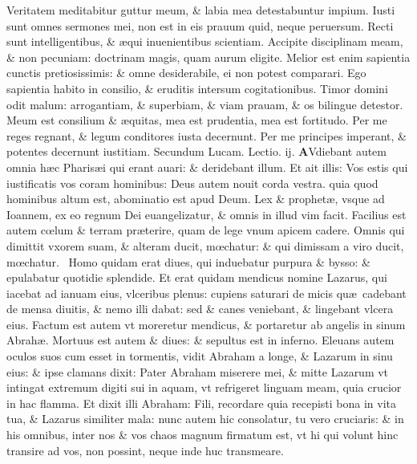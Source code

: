 \documentclass[a5paper,10pt]{book}
\def\leftmarginnote{%
	\lrmarginnote{\hskip -\marginparsep \hskip -6.5em}}
\def\ae{æ}
\def\oe{œ}
\begin{document}
\begin{multicols*}{2}
Veritatem meditabitur guttur meum, \& labia mea detestabuntur impium.
Iusti sunt omnes sermones mei, non est in eis prauum quid, neque peruersum. Recti sunt intelligentibus, \& \ae qui inuenientibus scientiam.
Accipite disciplinam meam, \& non pecuniam: doctrinam magis, quam aurum eligite.
Melior est enim sapientia cunctis pretiosissimis: \& omne desiderabile, ei non potest comparari.
Ego sapientia habito in consilio, \& eruditis intersum cogitationibus.
Timor domini odit malum: arrogantiam, \& superbiam, \& viam prauam, \& os bilingue detestor.
Meum est consilium \& \ae quitas, mea est prudentia, mea est fortitudo.
Per me reges regnant, \& legum conditores iusta decernunt. Per me principes imperant, \& potentes decernunt iustitiam.
\fancyhead[C]{\color{red} Feria. iiij. Dominic\ae . ij. post aduentum}
\newline \color{red} Secundum Lucam. \hfill Lectio. ij. \color{black}
\vspace{-.25em}
\lettrine[lines=2]{\bfseries \color{red} A}{}Vdiebant\leftmarginnote{\begin{flushright}c. 16.\end{flushright}} autem omnia h\ae c Pharis\ae i qui erant auari: \& deridebant illum.
Et ait illis: Vos estis qui iustificatis vos coram hominibus: Deus autem nouit corda vestra. quia quod hominibus altum est, abominatio est apud Deum.
Lex \& prophet\ae , vsque ad Ioannem, ex eo regnum Dei euangelizatur, \& omnis in illud vim facit.
Facilius est autem c\oe lum \& terram pr\ae terire, quam de lege vnum apicem cadere.
Omnis qui dimittit vxorem suam, \& alteram ducit, m\oe chatur: \& qui dimissam a viro ducit, m\oe chatur. \textdagger \ 
Homo\leftmarginnote{\begin{flushright}C\end{flushright}} quidam erat diues, qui induebatur purpura \& bysso: \& epulabatur quotidie splendide.
Et erat quidam mendicus nomine Lazarus, qui iacebat ad ianuam eius, vlceribus plenus: cupiens saturari de micis qu\ae \ cadebant de mensa
diuitis, \& nemo illi dabat: sed \& canes veniebant, \& lingebant vlcera eius.
Factum est autem vt moreretur mendicus, \& portaretur ab angelis in sinum Abrah\ae .
Mortuus est autem \& diues: \& sepultus est in inferno. Eleuans autem oculos suos cum esset in tormentis, vidit Abraham a longe, \& Lazarum in sinu eius: \& ipse clamans dixit: Pater Abraham miserere mei, \& mitte Lazarum vt intingat extremum digiti sui in aquam, vt refrigeret linguam meam, quia crucior in hac flamma.
Et dixit illi Abraham: Fili, recordare quia recepisti bona in vita tua, \& Lazarus similiter mala: nunc autem hic consolatur, tu vero cruciaris: \& in his omnibus, inter nos \& vos chaos magnum firmatum est, vt hi qui volunt hinc transire ad vos, non possint, neque inde huc transmeare.

\end{multicols*}
\end{document}
